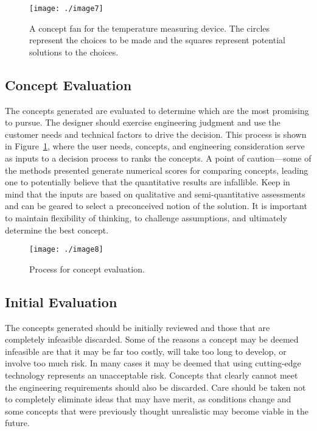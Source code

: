 \begin{figure}
\texttt{[image: ./image7]}
\caption{A concept fan for the temperature measuring device.
The circles represent the choices to be made and the squares represent
potential solutions to the choices.}
\label{figure:conceptFan}
\end{figure}


\subsection{Concept Evaluation}\label{concept-evaluation}

The concepts generated are evaluated to determine which are the most
promising to pursue. The designer should exercise engineering judgment
and use the customer needs and technical factors to drive the decision.
This process is shown in 
Figure~\ref{figure:conceptFan}, where the user needs, concepts, and
engineering consideration serve as inputs to a decision process to ranks
the concepts. A point of caution---some of the methods presented
generate numerical scores for comparing concepts, leading one to
potentially believe that the quantita­tive results are infallible. Keep
in mind that the inputs are based on qualitative and semi-quantitative
assessments and can be geared to select a preconceived notion of the
solution. It is important to maintain flexibility of thinking, to
challenge assumptions, and ultimately determine the best concept.

\begin{figure}
\texttt{[image: ./image8]}
\caption{Process for concept evaluation.}
\label{figure:conceptEvaluation}
\end{figure}


\subsection{Initial Evaluation}
\label{subsection:initial-evaluation}

The concepts generated should be initially reviewed and those that are
completely infeasible discarded. Some of the reasons a concept may be
deemed infeasible are that it may be far too costly, will take too long
to develop, or involve too much risk. In many cases it may be deemed
that using cutting-edge technology represents an unacceptable risk.
Concepts that clearly cannot meet the engineering requirements should
also be discarded. Care should be taken not to completely eliminate
ideas that may have merit, as conditions change and some concepts that
were previously thought unrealistic may become viable in the future.

